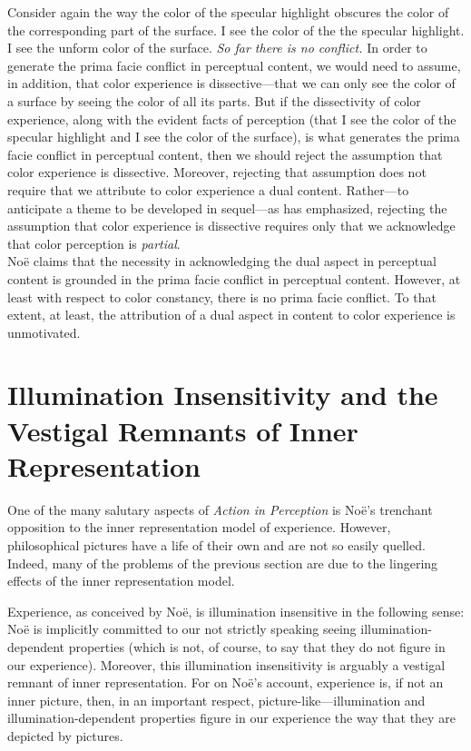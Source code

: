 \documentclass[12pt]{article}
\begin{document}
Consider again the way the color of the specular highlight obscures the color of the corresponding part of the surface. I see the color of the the specular highlight. I see the unform color of the surface. \emph{So far there is no conflict.} In order to generate the prima facie conflict in perceptual content, we would need to assume, in addition, that color experience is dissective---that we can only see the color of a surface by seeing the color of all its parts. But if the dissectivity of color experience, along with the evident facts of perception (that I see the color of the specular highlight and I see the color of the surface), is what generates the prima facie conflict in perceptual content, then we should reject the assumption that color experience is dissective. Moreover, rejecting that assumption does not require that we attribute to color experience a dual content. Rather---to anticipate a theme to be developed in sequel---as \citet{Hilbert:1987jq} has emphasized, rejecting the assumption that color experience is dissective requires only that we acknowledge that color perception is \emph{partial}.\\


\noindent Noë claims that the necessity in acknowledging the dual aspect in perceptual content is grounded in the prima facie conflict in perceptual content. However, at least with respect to color constancy, there is no prima facie conflict. To that extent, at least, the attribution of a dual aspect in content to color experience is unmotivated.


\section{Illumination Insensitivity and the Vestigal Remnants of Inner Representation} %
\label{sec:vestigal_remnants_of_inner_representations}

One of the many salutary aspects of \emph{Action in Perception} is Noë's trenchant opposition to the inner representation model of experience. However, philosophical pictures have a life of their own and are not so easily quelled. Indeed, many of the problems of the previous section are due to the lingering effects of the inner representation model.

Experience, as conceived by Noë, is illumination insensitive in the following sense: Noë is implicitly committed to our not strictly speaking seeing illumina\-tion-dependent properties (which is not, of course, to say that they do not figure in our experience). Moreover, this illumination insensitivity is arguably a vestigal remnant of inner representation. For on Noë's account, experience is, if not an inner picture, then, in an important respect, picture-like---illumination and illumination-dependent properties figure in our experience the way that they are depicted by pictures. 
\end{document}
